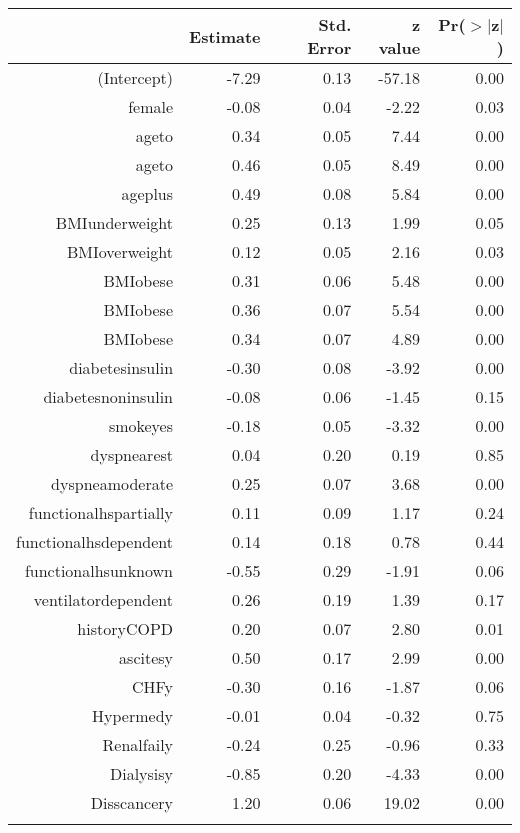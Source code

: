 \bigskip\bigskip
\centering
\begin{tabular}{rrrrr}
  \hline
 & Estimate & Std. Error & z value & Pr($>$$|$z$|$) \\ 
  \hline
(Intercept) & -7.29 & 0.13 & -57.18 & 0.00 \\ 
  female & -0.08 & 0.04 & -2.22 & 0.03 \\ 
  age\-65\-to\-74 & 0.34 & 0.05 & 7.44 & 0.00 \\ 
  age\-75\-to\-84 & 0.46 & 0.05 & 8.49 & 0.00 \\ 
  age\-85\-plus & 0.49 & 0.08 & 5.84 & 0.00 \\ 
  BMI\-underweight & 0.25 & 0.13 & 1.99 & 0.05 \\ 
  BMI\-overweight & 0.12 & 0.05 & 2.16 & 0.03 \\ 
  BMI\-obese\-1 & 0.31 & 0.06 & 5.48 & 0.00 \\ 
  BMI\-obese\-2 & 0.36 & 0.07 & 5.54 & 0.00 \\ 
  BMI\-obese\-3 & 0.34 & 0.07 & 4.89 & 0.00 \\ 
  diabetes\-insulin & -0.30 & 0.08 & -3.92 & 0.00 \\ 
  diabetes\-noninsulin & -0.08 & 0.06 & -1.45 & 0.15 \\ 
  smoke\-yes & -0.18 & 0.05 & -3.32 & 0.00 \\ 
  dyspnea\-rest & 0.04 & 0.20 & 0.19 & 0.85 \\ 
  dyspnea\-moderate & 0.25 & 0.07 & 3.68 & 0.00 \\ 
  functional\-hs\-partially & 0.11 & 0.09 & 1.17 & 0.24 \\ 
  functional\-hs\-dependent & 0.14 & 0.18 & 0.78 & 0.44 \\ 
  functional\-hs\-unknown & -0.55 & 0.29 & -1.91 & 0.06 \\ 
  ventilator\-dependent & 0.26 & 0.19 & 1.39 & 0.17 \\ 
  history\-COPD & 0.20 & 0.07 & 2.80 & 0.01 \\ 
  ascites\-y & 0.50 & 0.17 & 2.99 & 0.00 \\ 
  CHF\-y & -0.30 & 0.16 & -1.87 & 0.06 \\ 
  Hyper\-med\-y & -0.01 & 0.04 & -0.32 & 0.75 \\ 
  Renal\-fail\-y & -0.24 & 0.25 & -0.96 & 0.33 \\ 
  Dialysis\-y & -0.85 & 0.20 & -4.33 & 0.00 \\ 
  Diss\-cancer\-y & 1.20 & 0.06 & 19.02 & 0.00 \\ 
$$
\end{tabular}
